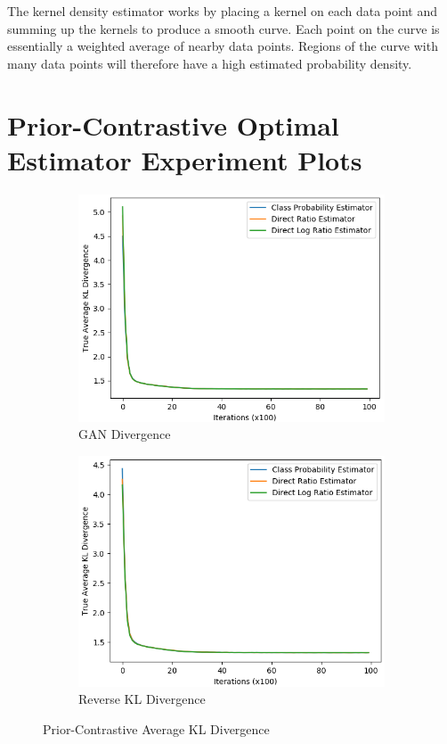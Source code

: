 \documentclass[honours,12pt]{unswthesis}
\numberwithin{equation}{section}
\theoremstyle{definition}
\begin{document}
The kernel density estimator works by placing a kernel on each data point and summing up the kernels to produce a smooth curve. Each point on the curve is essentially a weighted average of nearby data points. Regions of the curve with many data points will therefore have a high estimated probability density.
\chapter{Prior-Contrastive Optimal Estimator Experiment Plots}\label{app:E}
\begin{figure}[h]
\begin{subfigure}{0.49\textwidth}
\includegraphics[width=\linewidth]{truklmins/PCADVvsPCADVexpvsPCADVgudlog.png}
\caption{GAN Divergence}
\end{subfigure}
\begin{subfigure}{0.49\textwidth}
\includegraphics[width=\linewidth]{truklmins/PCKLDvsPCKLexpvsPCKLgudlog.png}
\caption{Reverse KL Divergence}
\end{subfigure}
\caption{Prior-Contrastive Average KL Divergence}
\end{figure}
\end{document}
